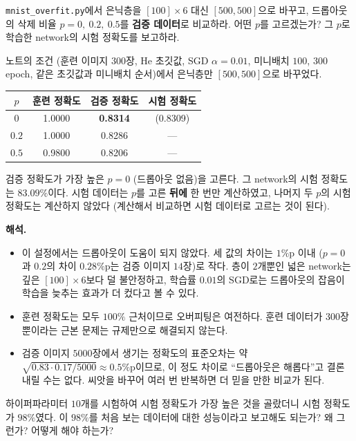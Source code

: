 \documentclass[11pt,a4paper]{article}
\begin{document}
\begin{problems}
\item \texttt{mnist\_overfit.py}에서 은닉층을 $[100]\times6$ 대신 $[500, 500]$으로 바꾸고,
드롭아웃의 삭제 비율 $p=0,\ 0.2,\ 0.5$를 \textbf{검증 데이터}로 비교하라.
어떤 $p$를 고르겠는가? 그 $p$로 학습한 network의 시험 정확도를 보고하라.

\begin{sol}
노트의 조건 (훈련 이미지 $300$장, He 초깃값, SGD $\alpha=0.01$, 미니배치 $100$, $300$ epoch, 같은 초깃값과 미니배치 순서)에서 은닉층만 $[500,500]$으로 바꾸었다.
\begin{center}
\begin{tabular}{cccc}
\toprule
$p$ & 훈련 정확도 & 검증 정확도 & 시험 정확도 \\
\midrule
$0$   & 1.0000 & \textbf{0.8314} & (0.8309) \\
$0.2$ & 1.0000 & 0.8286 & ---\\
$0.5$ & 0.9800 & 0.8206 & ---\\
\bottomrule
\end{tabular}
\end{center}
검증 정확도가 가장 높은 $\boxed{p=0}$ (드롭아웃 없음)을 고른다.
그 network의 시험 정확도는 $\boxed{83.09\%}$이다.
시험 데이터는 $p$를 고른 \textbf{뒤에} 한 번만 계산하였고, 나머지 두 $p$의 시험 정확도는 계산하지 않았다
(계산해서 비교하면 시험 데이터로 고르는 것이 된다).

\textbf{해석.}
\begin{itemize}[leftmargin=1.5em,itemsep=2pt]
\item 이 설정에서는 드롭아웃이 도움이 되지 않았다. 세 값의 차이는 $1\%$p 이내 ($p=0$과 $0.2$의 차이 $0.28\%$p는 검증 이미지 $14$장)로 작다.
층이 $2$개뿐인 넓은 network는 깊은 $[100]\times6$보다 덜 불안정하고, 학습률 $0.01$의 SGD로는 드롭아웃의 잡음이 학습을 늦추는 효과가 더 컸다고 볼 수 있다.
\item 훈련 정확도는 모두 $100\%$ 근처이므로 오버피팅은 여전하다. 훈련 데이터가 $300$장뿐이라는 근본 문제는 규제만으로 해결되지 않는다.
\item 검증 이미지 $5000$장에서 생기는 정확도의 표준오차는 약 $\sqrt{0.83\cdot0.17/5000}\approx0.5\%$p이므로, 이 정도 차이로 ``드롭아웃은 해롭다''고 결론 내릴 수는 없다. 씨앗을 바꾸어 여러 번 반복하면 더 믿을 만한 비교가 된다.
\end{itemize}
\end{sol}

\item 하이퍼파라미터 $10$개를 시험하여 시험 정확도가 가장 높은 것을 골랐더니 시험 정확도가 $98\%$였다.
이 $98\%$를 처음 보는 데이터에 대한 성능이라고 보고해도 되는가? 왜 그런가? 어떻게 해야 하는가?


\end{problems}
\end{document}
